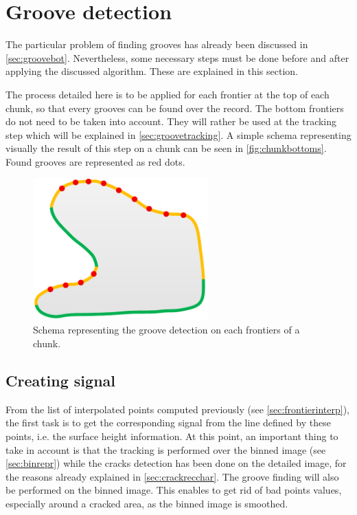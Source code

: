 \section{Groove detection}

The particular problem of finding grooves has already been discussed in \autoref{sec:groovebot}. Nevertheless, some necessary steps must be done before and after applying the discussed algorithm. These are explained in this section.

The process detailed here is to be applied for each frontier at the top of each chunk, so that every grooves can be found over the record. The bottom frontiers do not need to be taken into account. They will rather be used at the tracking step which will be explained in \autoref{sec:groovetracking}. A simple schema representing visually the result of this step on a chunk can be seen in \autoref{fig:chunkbottoms}. Found grooves are represented as red dots.

\begin{figure}[!ht]
\centering
\includegraphics[width=0.6\textwidth]{images/chunk-bottoms}
\caption{Schema representing the groove detection on each frontiers of a chunk.}
\label{fig:chunkbottoms}
\end{figure}

\subsection{Creating signal}

From the list of interpolated points computed previously (see \autoref{sec:frontierinterp}), the first task is to get the corresponding signal from the line defined by these points, i.e. the surface height information. At this point, an important thing to take in account is that the tracking is performed over the binned image (see \autoref{sec:binrepr}) while the cracks detection has been done on the detailed image, for the reasons already explained in \autoref{sec:crackrecchar}. The groove finding will also be performed on the binned image. This enables to get rid of bad points values, especially around a cracked area, as the binned image is smoothed.

